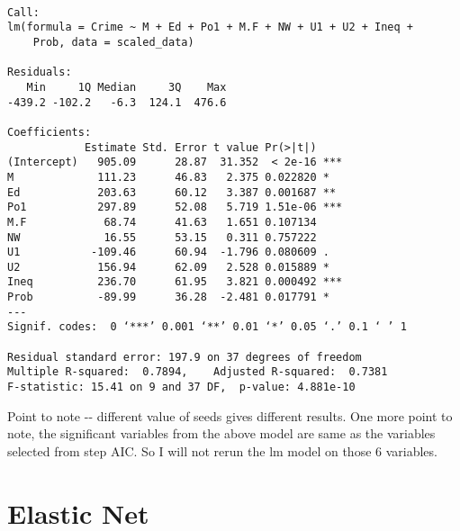 \documentclass[11pt]{article}
\begin{document}
    
    \begin{verbatim}

Call:
lm(formula = Crime ~ M + Ed + Po1 + M.F + NW + U1 + U2 + Ineq + 
    Prob, data = scaled_data)

Residuals:
   Min     1Q Median     3Q    Max 
-439.2 -102.2   -6.3  124.1  476.6 

Coefficients:
            Estimate Std. Error t value Pr(>|t|)    
(Intercept)   905.09      28.87  31.352  < 2e-16 ***
M             111.23      46.83   2.375 0.022820 *  
Ed            203.63      60.12   3.387 0.001687 ** 
Po1           297.89      52.08   5.719 1.51e-06 ***
M.F            68.74      41.63   1.651 0.107134    
NW             16.55      53.15   0.311 0.757222    
U1           -109.46      60.94  -1.796 0.080609 .  
U2            156.94      62.09   2.528 0.015889 *  
Ineq          236.70      61.95   3.821 0.000492 ***
Prob          -89.99      36.28  -2.481 0.017791 *  
---
Signif. codes:  0 ‘***’ 0.001 ‘**’ 0.01 ‘*’ 0.05 ‘.’ 0.1 ‘ ’ 1

Residual standard error: 197.9 on 37 degrees of freedom
Multiple R-squared:  0.7894,	Adjusted R-squared:  0.7381 
F-statistic: 15.41 on 9 and 37 DF,  p-value: 4.881e-10

    \end{verbatim}

    
    Point to note -\/- different value of seeds gives different results. One
more point to note, the significant variables from the above model are
same as the variables selected from step AIC. So I will not rerun the lm
model on those 6 variables.

    \section{Elastic Net}\label{elastic-net}
\end{document}
